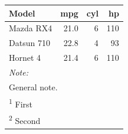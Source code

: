 \begin{table}
\centering
\begin{tabular}{lrrr}
\toprule
Model & mpg & cyl & hp\\
\midrule
Mazda RX4 & 21.0 & 6 & 110\\
Datsun 710 & 22.8 & 4 & 93\\
Hornet 4 & 21.4 & 6 & 110\\
\bottomrule
\multicolumn{4}{l}{\rule{0pt}{1em}\textit{Note: }}\\
\multicolumn{4}{l}{\rule{0pt}{1em}General note.}\\
\multicolumn{4}{l}{\rule{0pt}{1em}\textsuperscript{1} First}\\
\multicolumn{4}{l}{\rule{0pt}{1em}\textsuperscript{2} Second}\\
\end{tabular}
\end{table}
